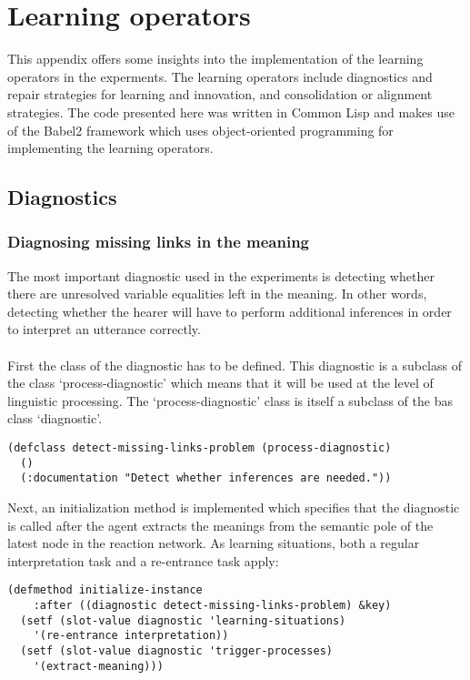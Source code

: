 
\chapter{Learning operators}
\label{a:learning}

This appendix offers some insights into the implementation of the learning operators in the experments. The learning operators include diagnostics and repair strategies for learning and innovation, and consolidation or alignment strategies. The code presented here was written in Common Lisp and makes use of the Babel2 framework which uses object-oriented programming for implementing the learning operators.

\section{Diagnostics}

\subsection{Diagnosing missing links in the meaning}

The most important diagnostic used in the experiments is detecting whether there are unresolved variable equalities left in the meaning. In other words, detecting whether the hearer will have to perform additional inferences in order to interpret an utterance correctly. 
\\
\\
First the class of the diagnostic has to be defined. This diagnostic is a subclass of the class `process-diagnostic' which means that it will be used at the level of linguistic processing. The `process-diagnostic' class is itself a subclass of the bas class `diagnostic'.

\begin{verbatim}
(defclass detect-missing-links-problem (process-diagnostic)
  ()
  (:documentation "Detect whether inferences are needed."))
\end{verbatim}

Next, an initialization method is implemented which specifies that the diagnostic is called after the agent extracts the meanings from the semantic pole of the latest node in the reaction network. As learning situations, both a regular interpretation task and a re-entrance task apply:

\newpage
\begin{verbatim}
(defmethod initialize-instance
    :after ((diagnostic detect-missing-links-problem) &key)
  (setf (slot-value diagnostic 'learning-situations) 
    '(re-entrance interpretation))
  (setf (slot-value diagnostic 'trigger-processes) 
    '(extract-meaning)))
\end{verbatim}

